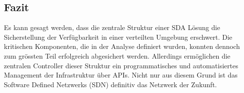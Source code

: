\subsection{Fazit}
Es kann gesagt werden, dass die zentrale Struktur einer SDA Lösung die Sicherstellung der Verfügbarkeit in einer verteilten Umgebung erschwert. Die kritischen Komponenten, die in der Analyse definiert wurden, konnten dennoch zum grössten Teil erfolgreich abgesichert werden. Allerdings ermöglichen die zentralen Controller dieser Struktur ein programmatisches und automatisiertes Management der Infrastruktur über APIs. Nicht nur aus diesem Grund ist das Software Defined Netzwerks (SDN) definitiv das Netzwerk der Zukunft. 

